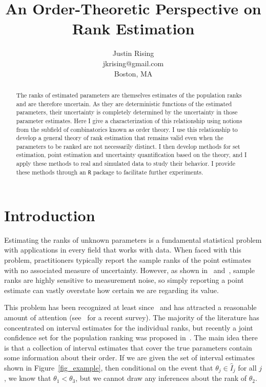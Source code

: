 \documentclass[12pt]{article}
\numberwithin{theorem}{section}
\begin{document}
\title{An Order-Theoretic Perspective on Rank Estimation}
\author{Justin Rising\\jkrising@gmail.com\\Boston, MA}
\maketitle

\begin{abstract}
The ranks of estimated parameters are themselves estimates of the population ranks and are therefore uncertain.  As they are deterministic functions of the estimated parameters, their uncertainty is completely determined by the uncertainty in those parameter estimates.  Here I give a characterization of this relationship using notions from the subfield of combinatorics known as order theory.  I use this relationship to develop a general theory of rank estimation that remains valid even when the parameters to be ranked are not necessarily distinct.  I then develop methods for set estimation, point estimation and uncertainty quantification based on the theory, and I apply these methods to real and simulated data to study their behavior.  I provide these methods through an \texttt{R} package to facilitate further experiments.
\end{abstract}

\section{Introduction}
\label{sec_intro}

Estimating the ranks of unknown parameters is a fundamental statistical problem with applications in every field that works with data.  When faced with this problem, practitioners typically report the sample ranks of the point estimates with no associated measure of uncertainty.  However, as shown in~\cite{hall2010variability} and~\cite{zuk2007uncertainty}, sample ranks are highly sensitive to measurement noise, so simply reporting a point estimate can vastly overstate how certain we are regarding its value.

This problem has been recognized at least since~\cite{goldstein1996tables} and has attracted a reasonable amount of attention (see~\cite{almohamad2022rankCIs} for a recent survey).  The majority of the literature has concentrated on interval estimates for the individual ranks, but recently a joint confidence set for the population ranking was proposed in~\cite{klein2020jointCR}.  The main idea there is that a collection of interval estimates that cover the true parameters contain some information about their order.  If we are given the set of interval estimates shown in Figure~\ref{fig_example}, then conditional on the event that $\theta_j \in \hat{I}_j$ for all $j$, we know that $\theta_1 < \theta_3$, but we cannot draw any inferences about the rank of $\theta_2$.
\end{document}

